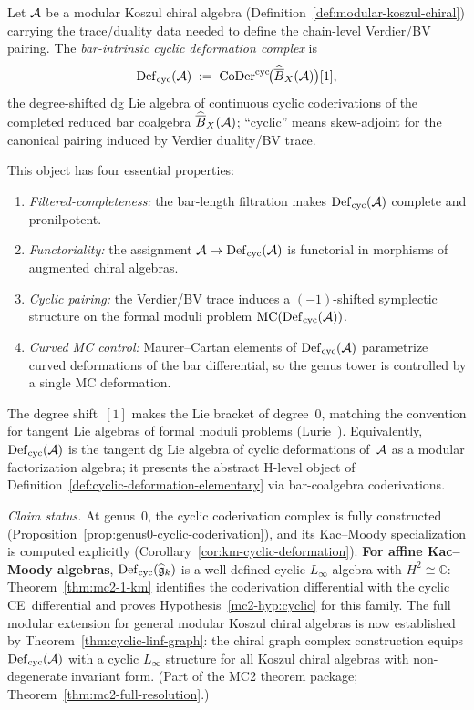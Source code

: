 \begin{definition}
\label{def:cyclic-deformation-bar}
Let $\mathcal{A}$ be a modular Koszul chiral algebra
(Definition~\ref{def:modular-koszul-chiral}) carrying the trace/duality
data needed to define the chain-level Verdier/BV pairing.  The
\emph{bar-intrinsic cyclic deformation complex} is
\begin{equation}\label{eq:def-cyc-bar}
\operatorname{Def}_{\mathrm{cyc}}(\mathcal{A})
\;:=\;
\operatorname{CoDer}^{\mathrm{cyc}}\!\bigl(
  \widehat{\overline{B}}_X(\mathcal{A})
\bigr)[1],
\end{equation}
the degree-shifted dg Lie algebra of continuous cyclic coderivations of
the completed reduced bar coalgebra $\widehat{\overline{B}}_X(\mathcal{A})$; ``cyclic''
means skew-adjoint for the canonical pairing induced by Verdier
duality/BV trace.

This object has four essential properties:
\begin{enumerate}[label=\textup{(\roman*)}]
\item \emph{Filtered-completeness:} the bar-length filtration makes
  $\operatorname{Def}_{\mathrm{cyc}}(\mathcal{A})$ complete and pronilpotent.
\item \emph{Functoriality:} the assignment $\mathcal{A} \mapsto \operatorname{Def}_{\mathrm{cyc}}(\mathcal{A})$
  is functorial in morphisms of augmented chiral algebras.
\item \emph{Cyclic pairing:} the Verdier/BV trace induces a
  $(-1)$-shifted symplectic structure on the formal moduli problem
  $\operatorname{MC}(\operatorname{Def}_{\mathrm{cyc}}(\mathcal{A}))$.
\item \emph{Curved MC control:} Maurer--Cartan elements of
  $\operatorname{Def}_{\mathrm{cyc}}(\mathcal{A})$ parametrize curved deformations of the bar
  differential, so the genus tower is controlled by a single MC
  deformation.
\end{enumerate}
The degree shift~$[1]$ makes the Lie bracket of degree~$0$, matching
the convention for tangent Lie algebras of formal moduli problems
(Lurie~\cite{LurieHA}).  Equivalently,
$\operatorname{Def}_{\mathrm{cyc}}(\mathcal{A})$ is the tangent dg Lie algebra of cyclic deformations
of~$\mathcal{A}$ as a modular factorization algebra; it presents the abstract
H-level object of Definition~\ref{def:cyclic-deformation-elementary}
via bar-coalgebra coderivations.

\smallskip\noindent
\emph{Claim status.}
At genus~$0$, the cyclic coderivation complex is fully constructed
(Proposition~\ref{prop:genus0-cyclic-coderivation}), and its
Kac--Moody specialization is computed explicitly
(Corollary~\ref{cor:km-cyclic-deformation}).
\textbf{For affine Kac--Moody algebras}, $\operatorname{Def}_{\mathrm{cyc}}(\widehat{\mathfrak{g}}_k)$
is a well-defined cyclic $L_\infty$-algebra with
$H^2 \cong \mathbb{C}$: Theorem~\ref{thm:mc2-1-km} identifies the
coderivation differential with the cyclic CE~differential and proves
Hypothesis~\ref{mc2-hyp:cyclic} for this family.
The full modular extension for general modular Koszul chiral
algebras is now established by
Theorem~\ref{thm:cyclic-linf-graph}: the chiral graph complex
construction equips $\operatorname{Def}_{\mathrm{cyc}}(\mathcal{A})$ with a cyclic $L_\infty$
structure for all Koszul chiral algebras with non-degenerate
invariant form.
(Part of the MC2 theorem package; Theorem~\ref{thm:mc2-full-resolution}.)
\end{definition}

